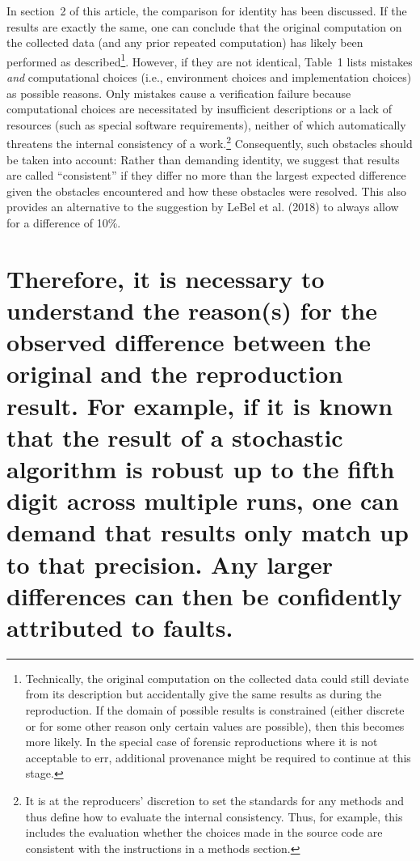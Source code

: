 \documentclass[authordate, empirical]{jote-new-article}
\begin{document}
	In section 2 of this article, the comparison for identity has been discussed. If the results are exactly the same, one can conclude that the original computation on the collected data (and any prior repeated computation) has likely been performed as described\footnote{ Technically, the original computation on the collected data could still deviate from its description but accidentally give the same results as during the reproduction. If the domain of possible results is constrained (either discrete or for some other reason only certain values are possible), then this becomes more likely. In the special case of forensic reproductions where it is not acceptable to err, additional provenance might be required to continue at this stage.}. However, if they are not identical, Table 1 lists mistakes \emph{and} computational choices (i.e., environment choices and implementation choices) as possible reasons. Only mistakes cause a verification failure because computational choices are necessitated by insufficient descriptions or a lack of resources (such as special software requirements), neither of which automatically threatens the internal consistency of a work.\footnote{ It is at the reproducers' discretion to set the standards for any methods and thus define how to evaluate the internal consistency. Thus, for example, this includes the evaluation whether the choices made in the source code are consistent with the instructions in a methods section.} Consequently, such obstacles should be taken into account: Rather than demanding identity, we suggest that results are called “consistent” if they differ no more than the largest expected difference given the obstacles encountered and how these obstacles were resolved. This also provides an alternative to the suggestion by LeBel et al. (2018) to always allow for a difference of 10\%.



	\section{Therefore, it is necessary to understand the reason(s) for the observed difference between the original and the reproduction result. For example, if it is known that the result of a stochastic algorithm is robust up to the fifth digit across multiple runs, one can demand that results only match up to that precision. Any larger differences can then be confidently attributed to faults.}
\end{document}
